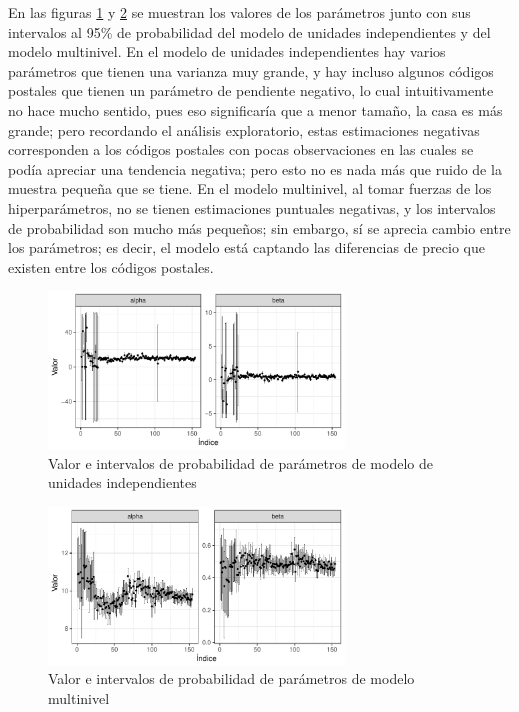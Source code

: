En las figuras \ref{fig:no_pooling_param_values} y \ref{fig:three_levels_param_values} se muestran los valores de los parámetros junto con sus intervalos al 95\% de probabilidad del modelo de unidades independientes y del modelo multinivel. En el modelo de unidades independientes hay varios parámetros que tienen una varianza muy grande, y hay incluso algunos códigos postales que tienen un parámetro de pendiente negativo, lo cual intuitivamente no hace mucho sentido, pues eso significaría que a menor tamaño, la casa es más grande; pero recordando el análisis exploratorio, estas estimaciones negativas corresponden a los códigos postales con pocas observaciones en las cuales se podía apreciar una tendencia negativa; pero esto no es nada más que ruido de la muestra pequeña que se tiene. En el modelo multinivel, al tomar fuerzas de los hiperparámetros, no se tienen estimaciones puntuales negativas, y los intervalos de probabilidad son mucho más pequeños; sin embargo, sí se aprecia cambio entre los parámetros; es decir, el modelo está captando las diferencias de precio que existen entre los códigos postales.

\begin{figure}[H]
    \centering
    \includegraphics[width=0.7\textwidth]{images/no_pooling_param_values.pdf}
    \caption{Valor e intervalos de probabilidad de parámetros de modelo de unidades independientes}
    \label{fig:no_pooling_param_values}
\end{figure}

\begin{figure}[H]
    \centering
    \includegraphics[width=0.7\textwidth]{images/three_levels_param_values.pdf}
    \caption{Valor e intervalos de probabilidad de parámetros de modelo multinivel}
    \label{fig:three_levels_param_values}
\end{figure}


